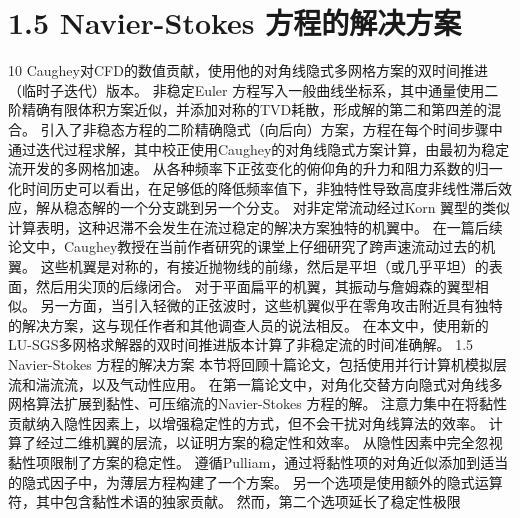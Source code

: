 \documentclass[UTF8,11pt,a4paper,openany,fontset=fandol]{ctexbook}
\begin{document}
\section{1.5 Navier-Stokes 方程的解决方案}
10 Caughey对CFD的数值贡献，使用他的对角线隐式多网格方案的双时间推进（临时子迭代）版本。 非稳定Euler 方程写入一般曲线坐标系，其中通量使用二阶精确有限体积方案近似，并添加对称的TVD耗散，形成解的第二和第四差的混合。 引入了非稳态方程的二阶精确隐式（向后向）方案，方程在每个时间步骤中通过迭代过程求解，其中校正使用Caughey的对角线隐式方案计算，由最初为稳定流开发的多网格加速。 从各种频率下正弦变化的俯仰角的升力和阻力系数的归一化时间历史可以看出，在足够低的降低频率值下，非独特性导致高度非线性滞后效应，解从稳态解的一个分支跳到另一个分支。 对非定常流动经过Korn 翼型的类似计算表明，这种迟滞不会发生在流过稳定的解决方案独特的机翼中。 在一篇后续论文中，Caughey教授在当前作者研究的课堂上仔细研究了跨声速流动过去的机翼。 这些机翼是对称的，有接近抛物线的前缘，然后是平坦（或几乎平坦）的表面，然后用尖顶的后缘闭合。 对于平面扁平的机翼，其振动与詹姆森的翼型相似。 另一方面，当引入轻微的正弦波时，这些机翼似乎在零角攻击附近具有独特的解决方案，这与现任作者和其他调查人员的说法相反。 在本文中，使用新的LU-SGS多网格求解器的双时间推进版本计算了非稳定流的时间准确解。 1.5 Navier-Stokes 方程的解决方案 本节将回顾十篇论文，包括使用并行计算机模拟层流和湍流流，以及气动性应用。 在第一篇论文中，对角化交替方向隐式对角线多网格算法扩展到黏性、可压缩流的Navier-Stokes 方程的解。 注意力集中在将黏性贡献纳入隐性因素上，以增强稳定性的方式，但不会干扰对角线算法的效率。 计算了经过二维机翼的层流，以证明方案的稳定性和效率。 从隐性因素中完全忽视黏性项限制了方案的稳定性。 遵循Pulliam，通过将黏性项的对角近似添加到适当的隐式因子中，为薄层方程构建了一个方案。 另一个选项是使用额外的隐式运算符，其中包含黏性术语的独家贡献。 然而，第二个选项延长了稳定性极限
\end{document}
